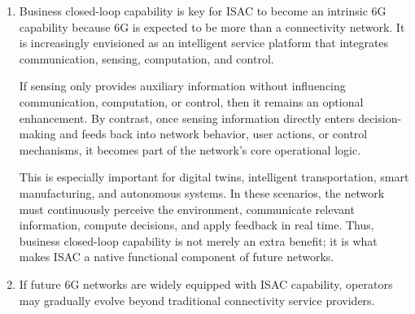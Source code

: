 \begin{enumerate}[label=\textbf{\arabic*.}, leftmargin=*]
\begin{enumerate}[label=(\alph*)]
        \item \textbf{Deployment efficiency:} \\
        Attaching independent sensors at scale requires additional site planning, installation, calibration, and maintenance. ISAC can often leverage existing communication infrastructure, making deployment faster and more practical.

        \item \textbf{Business closed-loop capability:} \\
        External sensing systems may remain loosely coupled to communication and control platforms, which weakens real-time interaction and end-to-end service orchestration. ISAC is better positioned to support a tightly integrated perception--communication--decision--feedback loop.
    \end{enumerate}

    Therefore, externally attached sensing can be useful in some scenarios, but it is not a complete substitute for ISAC, especially when large-scale integration and service closed loops are required.

    \item 
    Business closed-loop capability is key for ISAC to become an intrinsic 6G capability because 6G is expected to be more than a connectivity network. It is increasingly envisioned as an intelligent service platform that integrates communication, sensing, computation, and control.

    If sensing only provides auxiliary information without influencing communication, computation, or control, then it remains an optional enhancement. By contrast, once sensing information directly enters decision-making and feeds back into network behavior, user actions, or control mechanisms, it becomes part of the network's core operational logic.

    This is especially important for digital twins, intelligent transportation, smart manufacturing, and autonomous systems. In these scenarios, the network must continuously perceive the environment, communicate relevant information, compute decisions, and apply feedback in real time. Thus, business closed-loop capability is not merely an extra benefit; it is what makes ISAC a native functional component of future networks.

    \item 
    If future 6G networks are widely equipped with ISAC capability, operators may gradually evolve beyond traditional connectivity service providers.


\end{enumerate}
